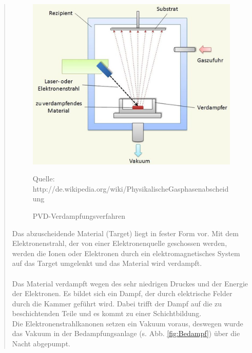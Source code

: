 \begin{quote}
    		\begin{figure}[H]
				\hspace{1.5 cm}
                  \includegraphics[scale=1, trim = 0cm 0cm 0cm 0cm,clip]
                	{./HerstellungBilder/SchematischeDarstellungeinesPVD-Verdampfungsverfahrens.png}
                  \caption{PVD-Verdampfungsverfahren}
                    \begin{center}
                      \small Quelle: http://de.wikipedia.org/wiki/PhysikalischeGasphasenabscheidung
             		\end{center}
                \label{fig:PVD}
            \end{figure}

    	\vspace{2em}

 		Das abzuscheidende Material (Target) liegt in fester Form vor. Mit dem
 		Elektronenstrahl, der von einer Elektronenquelle geschossen
 		werden, werden die Ionen oder Elektronen durch ein elektromagnetisches
 		System auf das Target umgelenkt und das Material wird verdampft.\\
		\\
		Das  Material verdampft  wegen des sehr niedrigen Druckes und der
		Energie der Elektronen. Es bildet sich ein Dampf, der durch elektrische
		Felder durch die Kammer geführt wird. Dabei trifft  der Dampf auf die zu
		beschichtenden Teile und es kommt zu einer Schichtbildung.\\
		Die Elektronenstrahlkanonen setzen ein Vakuum voraus, deswegen wurde das
		Vakuum in der Bedampfungsanlage (s. Abb. \ref{fig:Bedampf}) über die
		Nacht abgepumpt.


\end{quote}
